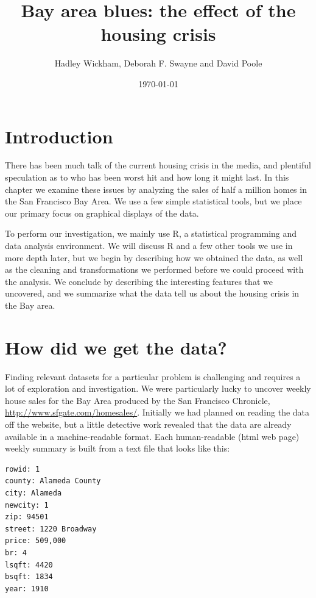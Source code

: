 \documentclass[oneside]{article}
\title{Bay area blues: the effect of the housing crisis}
\author{Hadley Wickham, Deborah F. Swayne and David Poole}
\date{\today}
\begin{document}
\maketitle 

\section{Introduction}

There has been much talk of the current housing crisis in the media, and plentiful speculation as to who has been worst hit and how long it might last.  In this chapter we examine these issues by analyzing the sales of half a million homes in the San Francisco Bay Area.  We use a few simple statistical tools, but we place our primary focus on graphical displays of the data.  


To perform our investigation, we mainly use R, a statistical programming and data analysis environment.  We will discuss R and a few other tools we use in more depth later, but we begin by describing how we obtained the data, as well as the cleaning and transformations we performed before we could proceed with the analysis. We conclude by describing the interesting features that we uncovered, and we summarize what the data tell us about the housing crisis in the Bay area.

\section{How did we get the data?}

Finding relevant datasets for a particular problem is challenging and requires a lot of exploration and investigation.  We were particularly lucky to uncover weekly house sales for the Bay Area produced by the San Francisco Chronicle, \url{http://www.sfgate.com/homesales/}.  Initially we had planned on reading the data off the website, but a little detective work revealed that the data are already available in a machine-readable format.  Each human-readable (html web page) weekly summary is built from a text file that looks like this: 

\begin{verbatim}
rowid: 1
county: Alameda County
city: Alameda
newcity: 1
zip: 94501
street: 1220 Broadway
price: 509,000
br: 4
lsqft: 4420
bsqft: 1834
year: 1910
\end{verbatim}
\end{document}
